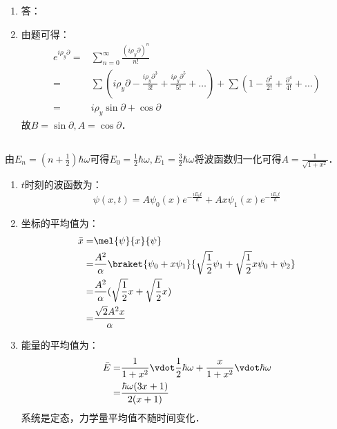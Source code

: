 \begin{enumerate}
\item 答：%
\item 由题可得：
\begin{equation}
\begin{aligned}
e^{i \rho_{y} \partial} =& \sum_{n=0}^{\infty} \frac{(i \rho_y \partial)^{n}}{n!} \\
=& \sum (i\rho_y \partial - \frac{i\rho_y \partial^3}{3!} + \frac{i\rho_y \partial^5}{5!} + \dots) + \sum (1 - \frac{\partial^2}{2!} + \frac{\partial^4}{4!} + \dots) \\
=& i\rho_y \sin{\partial} + \cos{\partial} 
\end{aligned}
\end{equation}
故$B=\sin{\partial},A=\cos{\partial}$．
\end{enumerate}
\subsection{ }
由$E_n = (n+\frac{1}{2})\hbar \omega$可得$E_0 = \frac{1}{2}\hbar \omega ,E_1 = \frac{3}{2}\hbar \omega$将波函数归一化可得$A=\frac{1}{\sqrt{1+x^2}}$．
\begin{enumerate}
\item $t$时刻的波函数为：
\begin{equation}
\psi(x,t)=A\psi_{0}(x)e^{-\frac{iE_{0}t}{\hbar}} + Ax\psi_{1}(x)e^{-\frac{iE_{1}t}{\hbar}}
\end{equation}
\item 坐标的平均值为：
\begin{equation}
\begin{aligned}
\bar{x} =& \mel{\psi}{x}{\psi} \\
=& \frac{A^{2}}{\alpha} \braket{\psi_{0} + x\psi_{1}}{\sqrt{\frac{1}{2}}\psi_{1} +\sqrt{\frac{1}{2}}x\psi_{0} + \psi_{2} } \\
=& \frac{A^{2}}{\alpha} (\sqrt{\frac{1}{2}}x + \sqrt{\frac{1}{2}}x) \\
=& \frac{\sqrt{2}A^{2}x}{\alpha}
\end{aligned}
\end{equation}
\item 能量的平均值为：
\begin{equation}
\begin{aligned}
\bar{E} =& \frac{1}{1+x^2}\vdot \frac{1}{2}\hbar \omega + \frac{x}{1+x^2}\vdot \hbar \omega \\
=& \frac{\hbar \omega (3x+1)}{2(x+1)}
\end{aligned}
\end{equation}
系统是定态，力学量平均值不随时间变化．
\end{enumerate}
